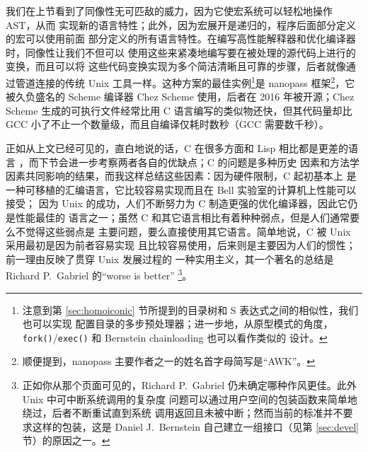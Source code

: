 我们在上节看到了同像性无可匹敌的威力，因为它使宏系统可以轻松地操作 AST，从而
实现新的语言特性；此外，因为宏展开是递归的，程序后面部分定义的宏可以使用前面
部分定义的所有语言特性。在编写高性能解释器和优化编译器时，同像性让我们不但可以
使用这些来紧凑地编写要在被处理的源代码上进行的变换，而且可以将
这些代码变换实现为多个简洁清晰且可靠的步骤，后者就像通过管道连接的传统 Unix
工具一样。这种方案的最佳实例\footnote{\label{fn:slew}注意到第
\ref{sec:homoiconic} 节所提到的目录树和 S 表达式之间的相似性，我们也可以实现
配置目录的多步预处理器；进一步地，从原型模式的角度，%
\texttt{fork()}/\texttt{exec()} 和 Bernstein chainloading 也可以看作类似的
设计。}是 nanopass 框架\footnote{顺便提到，nanopass
主要作者之一的姓名首字母简写是“AWK”。}，它被久负盛名的 Scheme 编译器 Chez
Scheme 使用，后者在 2016 年被开源；Chez Scheme
生成的可执行文件经常比用 C 语言编写的类似物还快，但其代码量却比
GCC 小了不止一个数量级，而且自编译仅耗时数秒（GCC 需要数千秒）。

正如从上文已经可见的，直白地说的话，C 在很多方面和 Lisp 相比都是更差的语言%
，而下节会进一步考察两者各自的优缺点；C 的问题是多种历史
因素和方法学因素共同影响的结果，而我这样总结这些因素：因为硬件限制，C 起初基本上
是一种可移植的汇编语言，它比较容易实现而且在 Bell 实验室的计算机上性能可以接受；
因为 Unix 的成功，人们不断努力为 C 制造更强的优化编译器，因此它仍是性能最佳的
语言之一；虽然 C 和其它语言相比有着种种弱点，但是人们通常要么不觉得这些弱点是
主要问题，要么直接使用其它语言。简单地说，C 被 Unix 采用最初是因为前者容易实现
且比较容易使用，后来则是主要因为人们的惯性；前一理由反映了贯穿 Unix 发展过程的
一种实用主义，其一个著名的总结是 Richard P.\ Gabriel 的“worse is better”%
\footnote{正如你从那个页面可见的，Richard
P.\ Gabriel 仍未确定哪种作风更佳。此外 Unix 中可中断系统调用的复杂度
问题可以通过用户空间的包装函数来简单地绕过，后者不断重试直到系统
调用返回且未被中断；然而当前的标准并不要求这样的包装，这是 Daniel
J.\ Bernstein 自己建立一组接口（见第 \ref{sec:devel} 节）的原因之一。}。

